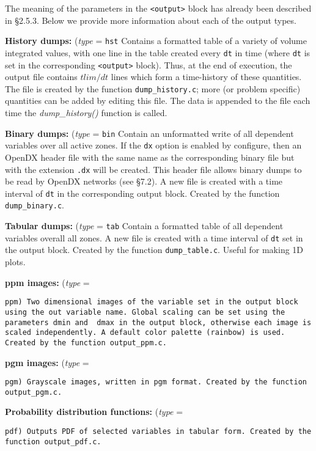 The meaning of the parameters in the {\tt <output>} block has already been
described in \S 2.5.3.  Below we provide more information about each of the
output types.
\begin{enumerate}

\item {\bf History dumps:} ({\em type} = {\tt hst} Contains a formatted
table of a variety of volume integrated values, with one line in the
table created every {\tt dt} in time (where {\tt dt} is set in the
corresponding {\tt <output>} block).  Thus, at the end of execution, the
output file contains $tlim/dt$ lines which form a time-history of these
quantities.  The file is created by the function {\tt dump\_history.c};
more (or problem specific) quantities can be added by editing this file.
The data is appended to the file each time the {\it dump\_history()}
function is called.

\item {\bf Binary dumps:} ({\em type} = {\tt bin} Contain an unformatted
write of all dependent variables over all active zones.  If the {\tt dx}
option is enabled by configure, then an OpenDX header file with the same
name as the corresponding binary file but with the extension {\tt .dx}
will be created.  This header file allows binary dumps to be read by
OpenDX networks (see \S7.2).  A new file is created with a time interval
of {\tt dt} in the corresponding output block.  Created by the function
{\tt dump\_binary.c}.

\item {\bf Tabular dumps:} ({\em type} = {\tt tab} Contain a formatted
table of all dependent variables overall all zones.  A new file is
created with a time interval of {\tt dt} set in the output block.
Created by the function {\tt dump\_table.c}.  Useful for making 1D plots.

\item {\bf  ppm images:} ({\em type} = {\tt ppm) Two dimensional images of
the variable set in the output block using the {\tt out} variable name.
Global scaling can be set using the parameters {\tt dmin} and {\tt
dmax} in the output block, otherwise each image is scaled independently.
A default color palette ({\tt rainbow}) is used.  Created by the function
{\tt output\_ppm.c}.

\item {\bf  pgm images:} ({\em type} = {\tt pgm) Grayscale images,
written in pgm format.  Created by the function {\tt output\_pgm.c}.

\item {\bf Probability distribution functions:} ({\em type} = {\tt pdf)
Outputs PDF of selected variables in tabular form.  Created by the
function {\tt output\_pdf.c}.

}}}
\end{enumerate}
